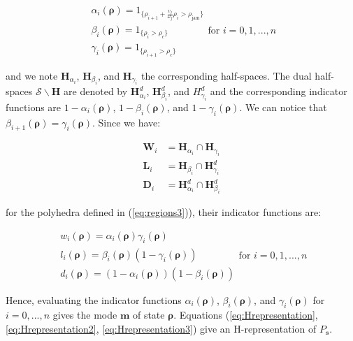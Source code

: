 \begin{equation}
\begin{array}{l}
\alpha_{i}(\boldsymbol\rho)=1_{\{\rho_{i+1} + \frac{v_{f}}{\omega_{f}}\rho_{i}>\rho_{\text{jam}}\}}\\
\beta_{i}(\boldsymbol\rho)=1_{\{\rho_{i}>\rho_{c}\}}\\
\gamma_{i}(\boldsymbol\rho)=1_{\{\rho_{i+1}>\rho_{c}\}}
\end{array}
\text{for }i=0,1,...,n
\label{eq:indicators}
\end{equation}

\noindent and we note $\textbf{H}_{\alpha_{i}}$, $\textbf{H}_{\beta_{i}}$, and $\textbf{H}_{\gamma_{i}}$ the corresponding half-spaces. The dual half-spaces $\mathcal{S}\backslash \textbf{H}$ are denoted by $\textbf{H}^{d}_{\alpha_{i}}$, $\textbf{H}^{d}_{\beta_{i}}$, and $H^{d}_{\gamma_{i}}$ and the corresponding indicator functions are $1-\alpha_{i}(\boldsymbol\rho)$, $1-\beta_{i}(\boldsymbol\rho)$, and $1-\gamma_{i}(\boldsymbol\rho)$. We can notice that $\beta_{i+1}(\boldsymbol\rho)=\gamma_{i}(\boldsymbol\rho)$. Since we have:

\begin{equation}
\begin{array}{ll}
\textbf{W}_{i}&=\textbf{H}_{\alpha_{i}}\cap \textbf{H}_{\gamma_{i}}\\
\textbf{L}_{i}&=\textbf{H}_{\beta_{i}}\cap \textbf{H}^{d}_{\gamma_{i}}\\
\textbf{D}_{i}&=\textbf{H}^{d}_{\alpha_{i}}\cap \textbf{H}^{d}_{\beta_{i}}
\end{array}
\label{eq:Hrepresentation3}
\end{equation}

\noindent for the polyhedra defined in (\ref{eq:regions3})), their indicator functions are:

\begin{equation}
\begin{array}{l}
w_{i}(\boldsymbol\rho)=\alpha_{i}(\boldsymbol\rho)\gamma_{i}(\boldsymbol\rho)\\
l_{i}(\boldsymbol\rho)=\beta_{i}(\boldsymbol\rho)(1-\gamma_{i}(\boldsymbol\rho))\\
d_{i}(\boldsymbol\rho)=(1-\alpha_{i}(\boldsymbol\rho))(1-\beta_{i}(\boldsymbol\rho))
\end{array}
\text{for }i=0,1,...,n
\label{eq:indicators2}
\end{equation}

Hence, evaluating the indicator functions $\alpha_{i}(\boldsymbol\rho)$, $\beta_{i}(\boldsymbol\rho)$, and $\gamma_{i}(\boldsymbol\rho)$ for $i=0,...,n$ gives the mode $\boldsymbol m$ of state $\boldsymbol\rho$. Equations (\ref{eq:Hrepresentation}, \ref{eq:Hrepresentation2}, \ref{eq:Hrepresentation3}) give an H-representation of $P_{\boldsymbol s}$.


